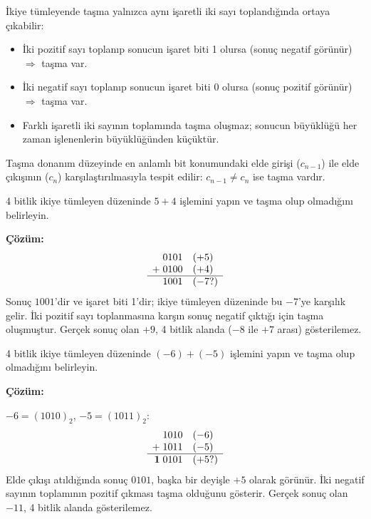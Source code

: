 İkiye tümleyende taşma yalnızca aynı işaretli iki sayı toplandığında ortaya çıkabilir:
\begin{itemize}
    \item İki pozitif sayı toplanıp sonucun işaret biti 1 olursa (sonuç negatif görünür) $\Rightarrow$ taşma var.
    \item İki negatif sayı toplanıp sonucun işaret biti 0 olursa (sonuç pozitif görünür) $\Rightarrow$ taşma var.
    \item Farklı işaretli iki sayının toplamında taşma oluşmaz; sonucun büyüklüğü her zaman işlenenlerin büyüklüğünden küçüktür.
\end{itemize}

Taşma donanım düzeyinde en anlamlı bit konumundaki elde girişi ($c_{n-1}$) ile elde çıkışının ($c_n$) karşılaştırılmasıyla tespit edilir: $c_{n-1} \neq c_n$ ise taşma vardır.

\begin{ornek}[A.18]
4 bitlik ikiye tümleyen düzeninde $5 + 4$ işlemini yapın ve taşma olup olmadığını belirleyin.

\textbf{Çözüm:}
\[
\begin{array}{r@{\quad}l}
  0101 & (+5)\\
+\; 0100 & (+4)\\
\hline
  1001 & (-7\text{?})
\end{array}
\]
Sonuç $1001$'dir ve işaret biti 1'dir; ikiye tümleyen düzeninde bu $-7$'ye karşılık gelir. İki pozitif sayı toplanmasına karşın sonuç negatif çıktığı için taşma oluşmuştur. Gerçek sonuç olan $+9$, 4 bitlik alanda ($-8$ ile $+7$ arası) gösterilemez.
\end{ornek}

\begin{ornek}[A.19]
4 bitlik ikiye tümleyen düzeninde $(-6) + (-5)$ işlemini yapın ve taşma olup olmadığını belirleyin.

\textbf{Çözüm:}

$-6 = (1010)_2$, $-5 = (1011)_2$:
\[
\begin{array}{r@{\quad}l}
  1010 & (-6)\\
+\; 1011 & (-5)\\
\hline
\mathbf{1}\;0101 & (+5\text{?})
\end{array}
\]
Elde çıkışı atıldığında sonuç $0101$, başka bir deyişle $+5$ olarak görünür. İki negatif sayının toplamının pozitif çıkması taşma olduğunu gösterir. Gerçek sonuç olan $-11$, 4 bitlik alanda gösterilemez.
\end{ornek}

